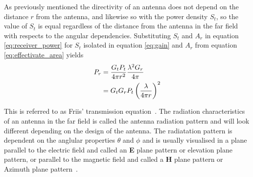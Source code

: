 As previously mentioned the directivity of an antenna does not depend on the distance $r$ from the antenna, and likewise so with the power density $S_t$, so the value of $S_t$ is equal regardless of the distance from the antenna in the far field with respects to the angular dependencies. Substituting $S_t$ and $A_r$ in equation \ref{eq:receiver_power} for $S_t$ isolated in equation \ref{eq:gain} and $A_r$ from equation \ref{eq:effectivate_area} yields
\begin{equation} \label{eq:friis}
    \begin{split}
        P_r & = \frac{G_t P_t}{4 \pi r^2} \frac{\lambda^2 G_r}{4 \pi} \\
        & = G_t  G_r P_t \left( \frac{\lambda}{4 \pi r} \right)^2
        \tagaddtext{[\si{\watt}]}
    \end{split}
\end{equation} 

This is referred to as Friis' transmission equation~\cite[pp. 1.10-1.11]{ant_eng_hk}. The radiation characteristics of an antenna in the far field is called the antenna radiation pattern and will look different depending on the design of the antenna. The radiatation pattern is dependent on the anglular properties $\theta$ and $\phi$ and is usually visualised in a plane parallel to the electric field and called an \textbf{E} plane pattern or elevation plane pattern, or parallel to the magnetic field and called a \textbf{H} plane pattern or Azimuth plane pattern~\cite[p. 79-80]{direct_energy}\cite[p. 13-14]{ant_beam_form}.

